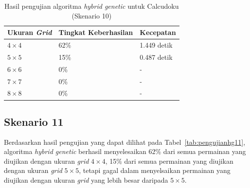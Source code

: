 \begin{table}
\centering
\captionsetup{justification=centering}
\caption[Hasil pengujian algoritma \textit{hybrid genetic} untuk Calcudoku (Skenario 10)]{Hasil pengujian algoritma \textit{hybrid genetic} untuk Calcudoku (Skenario 10)}
\begin{tabular}{| l | l | l |}
\hline
Ukuran \textit{Grid} & Tingkat Keberhasilan & Kecepatan \\
\hline \hline
\begin{math}4 \times 4\end{math} & 62\% & 1.449 detik \\
\hline
\begin{math}5 \times 5\end{math} & 15\% & 0.487 detik \\
\hline
\begin{math}6 \times 6\end{math} & 0\% & - \\
\hline
\begin{math}7 \times 7\end{math} & 0\% & - \\
\hline
\begin{math}8 \times 8\end{math} & 0\% & - \\
\hline
\end{tabular}
\label{tab:pengujianhg10}
\end{table}

\subsection{Skenario 11}
\label{sec:skenario11}

Berdasarkan hasil pengujian yang dapat dilihat pada Tabel~\ref{tab:pengujianhg11}, algoritma \textit{hybrid genetic} berhasil menyelesaikan 62\% dari semua permainan yang diujikan dengan ukuran \textit{grid} \begin{math}4 \times 4\end{math}, 15\% dari semua permainan yang diujikan dengan ukuran \textit{grid} \begin{math}5 \times 5\end{math}, tetapi gagal dalam menyelsaikan permainan yang diujikan dengan ukuran \textit{grid} yang lebih besar daripada \begin{math}5 \times 5\end{math}.

